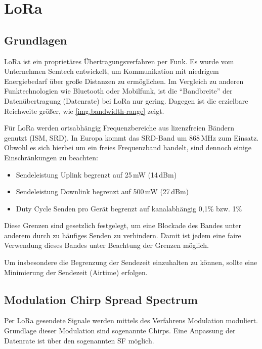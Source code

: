 \chapter{LoRa}\label{chp.lora}



\section{Grundlagen}\label{sec.lora.basics}
LoRa ist ein proprietäres Übertragungsverfahren per Funk.
Es wurde vom Unternehmen Semtech entwickelt, um Kommunikation mit niedrigem Energiebedarf über große Distanzen zu ermöglichen.
Im Vergleich zu anderen Funktechnologien wie Bluetooth oder Mobilfunk, ist die "`Bandbreite"' der Datenübertragung (Datenrate) bei LoRa nur gering.
Dagegen ist die erzielbare Reichweite größer, wie \autoref{img.bandwidth-range} zeigt.
\cite{semtech}


Für LoRa werden ortsabhängig Frequenzbereiche aus lizenzfreien Bändern genutzt (\gls{ISM}, \gls{SRD}).
In Europa kommt das SRD-Band um 868\,MHz zum Einsatz.\cite{loraparameter}
Obwohl es sich hierbei um ein freies Frequenzband handelt, sind dennoch einige Einschränkungen zu beachten:\cite{lorabasics}
\begin{itemize}\singlespacing\setlength\itemsep{-0.2em}
\item Sendeleistung \gls{Uplink} begrenzt auf 25\,mW (14\,dBm)
\item Sendeleistung \gls{Downlink} begrenzt auf 500\,mW (27\,dBm)
\item Duty Cycle Senden pro Gerät begrenzt auf kanalabhängig 0,1\% bzw. 1\%
\end{itemize}
Diese Grenzen sind gesetzlich festgelegt, um eine Blockade des Bandes unter anderem durch zu häufiges Senden zu verhindern.
Damit ist jedem eine faire Verwendung dieses Bandes unter Beachtung der Grenzen möglich.

Um insbesondere die Begrenzung der Sendezeit einzuhalten zu können, sollte eine Minimierung der Sendezeit (\gls{Airtime}) erfolgen.



\section{Modulation Chirp Spread Spectrum }\label{sec.lora.modulation}
Per LoRa gesendete Signale werden mittels des Verfahrens \gls{Modulation} moduliert.
Grundlage dieser Modulation sind sogenannte \glspl{Chirp}.
Eine Anpassung der Datenrate ist über den sogenannten \gls{SF} möglich.


